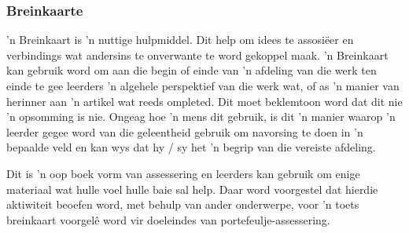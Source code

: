 \subsubsection{Breinkaarte}
'n Breinkaart is 'n nuttige hulpmiddel. Dit help om idees te
assosi\"{e}er en verbindings wat andersins te onverwante te word
gekoppel maak. 'n Breinkaart kan gebruik word om aan die begin of
einde van 'n afdeling van die werk ten einde te gee leerders 'n
algehele perspektief van die werk wat, of as 'n manier van herinner
aan 'n artikel wat reeds ompleted. Dit moet beklemtoon word dat dit
nie 'n opsomming is nie. Ongeag hoe 'n mens dit gebruik, is dit 'n
manier waarop 'n leerder gegee word van die geleentheid gebruik om
navorsing te doen in 'n bepaalde veld en kan wys dat hy / sy het 'n
begrip van die vereiste afdeling.

Dit is 'n oop boek vorm van assessering en leerders kan gebruik om
enige materiaal wat hulle voel hulle baie sal help. Daar word
voorgestel dat hierdie aktiwiteit beoefen word, met behulp van ander
onderwerpe, voor 'n toets breinkaart voorgel\^{e} word vir doeleindes van
portefeulje-assessering.

